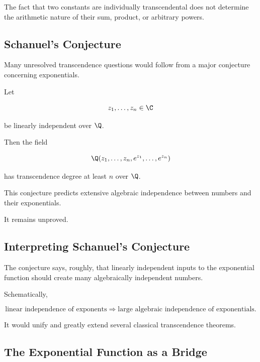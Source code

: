 \begin{warningbox}
The fact that two constants are individually transcendental does not
determine the arithmetic nature of their sum, product, or arbitrary powers.
\end{warningbox}

\subsection{Schanuel's Conjecture}
\label{subsec:schanuel-conjecture}

Many unresolved transcendence questions would follow from a major conjecture
concerning exponentials.

\begin{conjecture}[Schanuel]
Let

\[ z_1,\ldots,z_n\in\C \]

be linearly independent over \(\Q\).

Then the field

\[ \Q(z_1,\ldots,z_n,e^{z_1},\ldots,e^{z_n}) \]

has transcendence degree at least \(n\) over \(\Q\).
\end{conjecture}

This conjecture predicts extensive algebraic independence between numbers
and their exponentials.

It remains unproved.

\subsection{Interpreting Schanuel's Conjecture}
\label{subsec:interpreting-schanuel}

The conjecture says, roughly, that linearly independent inputs to the
exponential function should create many algebraically independent numbers.

Schematically,

\[
\boxed{
\text{linear independence of exponents}
\Longrightarrow
\text{large algebraic independence of exponentials}.
}
\]

It would unify and greatly extend several classical transcendence theorems.

\subsection{The Exponential Function as a Bridge}
\label{subsec:exponential-function-bridge}

